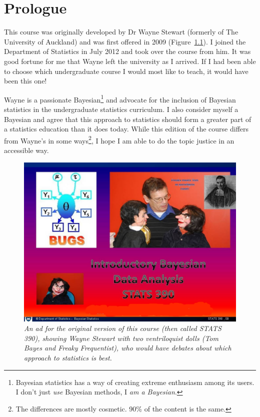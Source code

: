 \chapter{Prologue}
This course was originally developed by Dr Wayne Stewart (formerly of The
University of
Auckland) and was first offered in 2009 (Figure~\ref{fig:wayne}).
I joined the Department of Statistics in July 2012
and took over the course from him. It was good fortune for me that Wayne left
the university as I arrived. If I had been able to choose which undergraduate
course I would most like to teach, it would have been this one!

Wayne is a passionate Bayesian\footnote{Bayesian statistics has a way of
creating extreme enthusiasm among its users. I don't just {\it use} Bayesian
methods, I {\it am a Bayesian}.}
and advocate
for the inclusion of Bayesian statistics in the undergraduate
statistics curriculum. I also consider myself a Bayesian and agree that this
approach to statistics should form a greater part of a statistics education
than it does today. 
While this edition of the course differs from Wayne's in some ways\footnote{
The differences are mostly cosmetic. 90\% of the content is the same.},
I hope I am able to do the topic justice in an accessible way.

\begin{figure}[ht!]
\begin{center}
\includegraphics[scale=0.5]{Figures/390course.jpg}
\end{center}
\caption{\it An ad for the original version of this course (then called
STATS 390), showing Wayne Stewart with two ventriloquist dolls (Tom Bayes and
Freaky Frequentist), who would have debates about which approach to statistics
is best.\label{fig:wayne}}
\end{figure}


